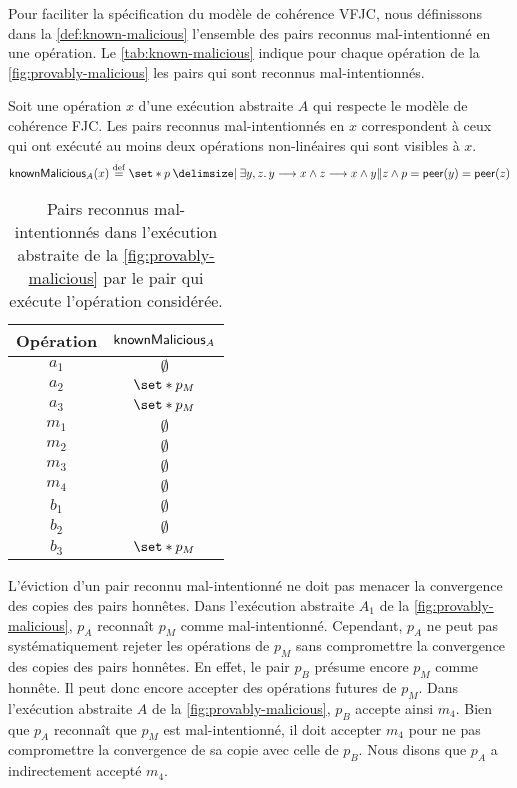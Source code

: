 Pour faciliter la spécification du modèle de cohérence \ac{VFJC}, nous définissons dans la \autoref{def:known-malicious} l'ensemble des pairs reconnus mal-intentionné en une opération.
Le \autoref{tab:known-malicious} indique pour chaque opération de la \autoref{fig:provably-malicious} les pairs qui sont reconnus mal-intentionnés.

\begin{definition}\label{def:known-malicious}
  Soit une opération $x$ d'une exécution abstraite $A$ qui respecte le modèle de cohérence \acl{FJC}.
  Les pairs reconnus mal-intentionnés en $x$ correspondent à ceux qui ont exécuté au moins deux opérations non-linéaires qui sont visibles à $x$.
  \begin{equation*}
      \trm{knownMalicious}_A(x) \defeq \set*{p \given \exists y, z \qsep y \pre x \land z \pre x \land y \concur z \land p = \trm{peer}(y) = \trm{peer}(z)}
  \end{equation*}
\end{definition}

\begin{table}[htb]
    \centering
    \begin{tabular}{cc}
        Opération & $\operatorname{\mathsf{knownMalicious}}_A$ \\
        \toprule
        $a_1$ & $\emptyset$ \\
        $a_2$ & $\set*{p_M}$ \\
        $a_3$ & $\set*{p_M}$ \\
        $m_1$ & $\emptyset$ \\
        $m_2$ & $\emptyset$ \\
        $m_3$ & $\emptyset$ \\
        $m_4$ & $\emptyset$ \\
        $b_1$ & $\emptyset$ \\
        $b_2$ & $\emptyset$ \\
        $b_3$ & $\set*{p_M}$ \\
    \end{tabular}
    \caption{Pairs reconnus mal-intentionnés dans l'exécution abstraite de la \autoref{fig:provably-malicious} par le pair qui exécute l'opération considérée.}\label{tab:known-malicious}
\end{table}

L'éviction d'un pair reconnu mal-intentionné ne doit pas menacer la convergence des copies des pairs honnêtes.
Dans l'exécution abstraite $A_1$ de la \autoref{fig:provably-malicious}, $p_A$ reconnaît $p_M$ comme mal-intentionné.
Cependant, $p_A$ ne peut pas systématiquement rejeter les opérations de $p_M$ sans compromettre la convergence des copies des pairs honnêtes.
En effet, le pair $p_B$ présume encore $p_M$ comme honnête.
Il peut donc encore accepter des opérations futures de $p_M$.
Dans l'exécution abstraite $A$ de la \autoref{fig:provably-malicious}, $p_B$ accepte ainsi $m_4$.
Bien que $p_A$ reconnaît que $p_M$ est mal-intentionné, il doit accepter $m_4$ pour ne pas compromettre la convergence de sa copie avec celle de $p_B$.
Nous disons que $p_A$ a indirectement accepté $m_4$.


